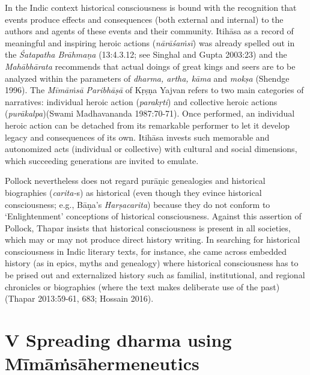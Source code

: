 In the Indic context historical consciousness is bound with the recognition that events produce effects and consequences (both external and internal) to the authors and agents of these events and their community. Itihāsa as a record of meaningful and inspiring heroic actions (\textit{nārāśaṁsī}) was already spelled out in the \textit{Śatapatha Brāhmaṇa } (13:4.3.12; see Singhal and Gupta 2003:23) and the \textit{Mahābhārata} recommends that actual doings of great kings and seers are to be analyzed within the parameters of \textit{dharma, artha, kāma} and \textit{mokṣa} (Shendge 1996). The \textit{Mīmāṁsā Paribhāṣā} of Kṛṣṇa Yajvan refers to two main categories of narratives: individual heroic action (\textit{parakṛti}) and collective heroic actions (\textit{purākalpa})(Swami Madhavananda 1987:70-71). Once performed, an individual heroic action can be detached from its remarkable performer to let it develop legacy and consequences of its own. Itihāsa invests such memorable and autonomized acts (individual or collective) with cultural and social dimensions, which succeeding generations are invited to emulate.

Pollock nevertheless does not regard purāṇic genealogies and historical biographies (\textit{carita-}s) as historical (even though they evince historical consciousness; e.g., Bāṇa’s \textit{Harṣacarita}) because they do not conform to ‘Enlightenment’ conceptions of historical consciousness. Against this assertion of Pollock, Thapar insists that historical consciousness is present in all societies, which may or may not produce direct history writing. In searching for historical consciousness in Indic literary texts, for instance, she came across embedded history (as in epics, myths and genealogy) where historical consciousness has to be prised out and externalized history such as familial, institutional, and regional chronicles or biographies (where the text makes deliberate use of the past)(Thapar 2013:59-61, 683; Hossain 2016).


\section*{V Spreading dharma using Mīmāṁsā\hfill \break hermeneutics}

